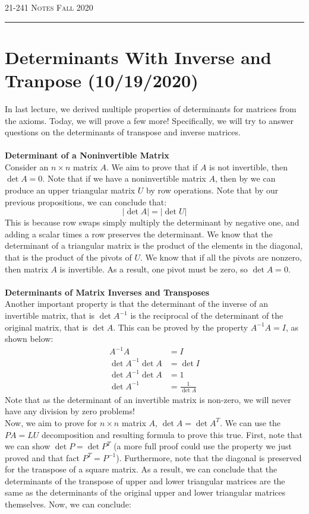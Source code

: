 \documentclass[12pt]{amsart}
\begin{document}
\thispagestyle{empty}

{\scshape 21-241} \hfill {\scshape \Large Notes} \hfill {\scshape Fall 2020}
\medskip
\hrule
\bigskip

\section*{Determinants With Inverse and Tranpose (10/19/2020)}
In last lecture, we derived multiple properties of determinants for matrices from the axioms. Today, we will prove a few more! Specifically, we will try to answer questions on the determinants of transpose and inverse matrices.\\ \\
\textbf{Determinant of a Noninvertible Matrix}\\
Consider an $n \times n$ matrix $A$. We aim to prove that if $A$ is not invertible, then $\det A = 0$. Note that if we have a noninvertible matrix $A$, then by we can produce an upper triangular matrix $U$ by row operations. Note that by our previous propositions, we can conclude that:
\[|\det A|  = |\det U|\]
This is because row swaps simply multiply the determinant by negative one, and adding a scalar times a row preserves the determinant. We know that the determinant of a triangular matrix is the product of the elements in the diagonal, that is the product of the pivots of $U$. We know that if all the pivots are nonzero, then matrix $A$ is invertible. As a result,  one pivot must be zero, so $\det A = 0$.\\
\\
\textbf{Determinants of Matrix Inverses and Transposes}\\
Another important property is that the determinant of the inverse of an invertible matrix, that is $\det A^{-1}$ is the reciprocal of the determinant of the original matrix, that is $\det A$. This can be proved by the property $A^{-1}A=I$, as shown below:
\begin{align*}
	A^{-1}A &= I\\
	\det A^{-1} \det A &= \det I\\
	\det A^{-1} \det A &= 1\\
	\det A^{-1} &= \frac{1}{\det A}
\end{align*}
Note that as the determinant of an invertible matrix is non-zero, we will never have any division by zero problems!\\
Now, we aim to prove for $n \times n$ matrix $A$, $\det A = \det A^T$. We can use the $PA=LU$ decomposition and resulting formula to prove this true. First, note that we can show $\det P = \det P^T$ (a more full proof could use the property we just proved and that fact $P^T = P^{-1}$). Furthermore, note that the diagonal is preserved for the transpose of a square matrix. As a result, we can conclude that the determinants of the transpose of upper and lower triangular matrices are the same as the determinants of the original upper and lower triangular matrices themselves. Now, we can conclude:
\end{document}
